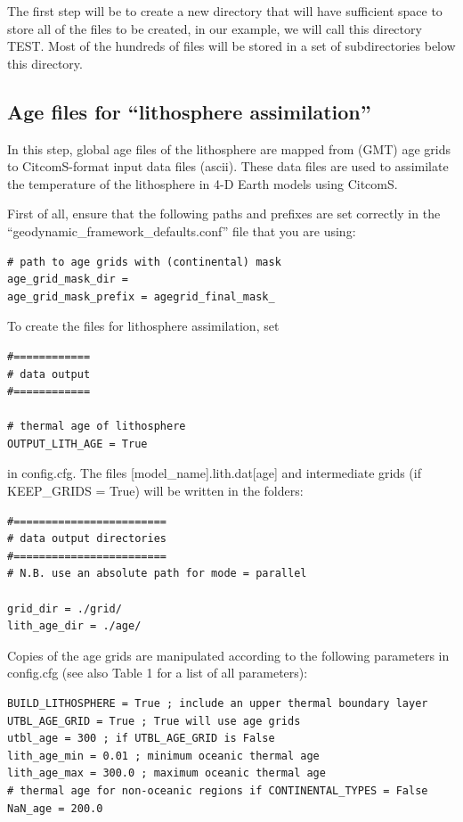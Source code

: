 \documentclass[letterpaper,12pt]{article}
\begin{document}
The first step will be to create a new directory that will have sufficient space to store all of the files to be created, in our example, we will call this directory TEST. Most of the hundreds of files will be stored in a set of subdirectories below this directory.

\subsection{Age files for ``lithosphere assimilation''}
\label{ssect:input_age}
In this step, global age files of the lithosphere are mapped from (GMT) age grids to CitcomS-format input data files (ascii).
These data files are used to assimilate the temperature of the lithosphere in 4-D Earth models using CitcomS.

First of all, ensure that the following paths and prefixes are set correctly in the \\``geodynamic\_framework\_defaults.conf'' file that you are using:

\begin{verbatim}
# path to age grids with (continental) mask
age_grid_mask_dir =
age_grid_mask_prefix = agegrid_final_mask_
\end{verbatim}

To create the files for lithosphere assimilation, set 

\begin{verbatim}
#============
# data output
#============

# thermal age of lithosphere
OUTPUT_LITH_AGE = True
\end{verbatim}

in config.cfg. The files [model\_name].lith.dat[age] and intermediate grids (if KEEP\_GRIDS = True) will be written in the folders:

\begin{verbatim}
#========================
# data output directories
#========================
# N.B. use an absolute path for mode = parallel

grid_dir = ./grid/
lith_age_dir = ./age/
\end{verbatim}

Copies of the age grids are manipulated according to the following parameters in config.cfg (see also Table 1 for a list of all parameters):

\begin{verbatim}
BUILD_LITHOSPHERE = True ; include an upper thermal boundary layer
UTBL_AGE_GRID = True ; True will use age grids
utbl_age = 300 ; if UTBL_AGE_GRID is False
lith_age_min = 0.01 ; minimum oceanic thermal age
lith_age_max = 300.0 ; maximum oceanic thermal age
# thermal age for non-oceanic regions if CONTINENTAL_TYPES = False
NaN_age = 200.0
\end{verbatim}
\end{document}
